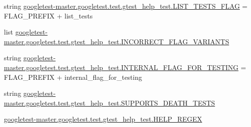 \begin{DoxyCompactItemize}
\item 
string \mbox{\hyperlink{namespacegoogletest-master_1_1googletest_1_1test_1_1gtest__help__test_ac89388488288f7e8d157c6b09cb6be29}{googletest-\/master.\+googletest.\+test.\+gtest\+\_\+help\+\_\+test.\+L\+I\+S\+T\+\_\+\+T\+E\+S\+T\+S\+\_\+\+F\+L\+AG}} = F\+L\+A\+G\+\_\+\+P\+R\+E\+F\+IX + \textquotesingle{}list\+\_\+tests\textquotesingle{}
\item 
list \mbox{\hyperlink{namespacegoogletest-master_1_1googletest_1_1test_1_1gtest__help__test_a5448289a36b46ae8920661da1f01bf20}{googletest-\/master.\+googletest.\+test.\+gtest\+\_\+help\+\_\+test.\+I\+N\+C\+O\+R\+R\+E\+C\+T\+\_\+\+F\+L\+A\+G\+\_\+\+V\+A\+R\+I\+A\+N\+TS}}
\item 
string \mbox{\hyperlink{namespacegoogletest-master_1_1googletest_1_1test_1_1gtest__help__test_a8993bf083ef0343f4283931cb1bcfded}{googletest-\/master.\+googletest.\+test.\+gtest\+\_\+help\+\_\+test.\+I\+N\+T\+E\+R\+N\+A\+L\+\_\+\+F\+L\+A\+G\+\_\+\+F\+O\+R\+\_\+\+T\+E\+S\+T\+I\+NG}} = F\+L\+A\+G\+\_\+\+P\+R\+E\+F\+IX + \textquotesingle{}internal\+\_\+flag\+\_\+for\+\_\+testing\textquotesingle{}
\item 
string \mbox{\hyperlink{namespacegoogletest-master_1_1googletest_1_1test_1_1gtest__help__test_a6b5272f782471cf6e73d406f10409ca0}{googletest-\/master.\+googletest.\+test.\+gtest\+\_\+help\+\_\+test.\+S\+U\+P\+P\+O\+R\+T\+S\+\_\+\+D\+E\+A\+T\+H\+\_\+\+T\+E\+S\+TS}}
\item 
\mbox{\hyperlink{namespacegoogletest-master_1_1googletest_1_1test_1_1gtest__help__test_ad9f3e7aca557f6fce3491e5b9649deb8}{googletest-\/master.\+googletest.\+test.\+gtest\+\_\+help\+\_\+test.\+H\+E\+L\+P\+\_\+\+R\+E\+G\+EX}}
\end{DoxyCompactItemize}

